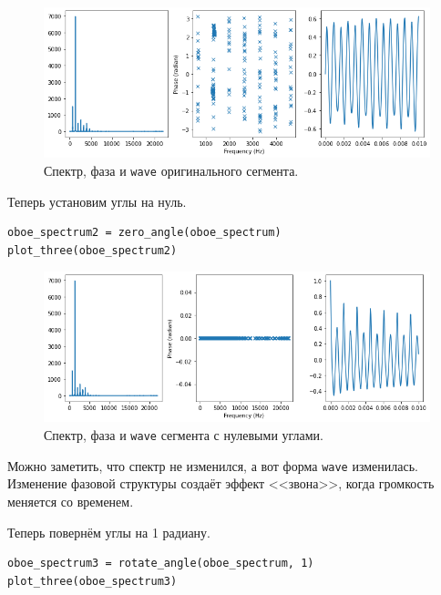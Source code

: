 \documentclass[a4paper, 14pt]{extarticle}
\begin{document}
    \begin{figure}[h]
        \centering
        \includegraphics[width=0.8\linewidth]{resources/Images/task3_three}
        \caption{Спектр, фаза и \texttt{wave} оригинального сегмента.}
        \label{fig:task3_three}
    \end{figure}

    Теперь установим углы на нуль.

    \begin{lstlisting}[caption= Применение \texttt{plot\_three} к сегменту с нулевыми углами., label={lst:task3_three_zero}]
oboe_spectrum2 = zero_angle(oboe_spectrum)
plot_three(oboe_spectrum2)  \end{lstlisting}

    \begin{figure}[h]
        \centering
        \includegraphics[width=0.8\linewidth]{resources/Images/task3_three_zero}
        \caption{Спектр, фаза и \texttt{wave} сегмента с нулевыми углами.}
        \label{fig:task3_three_zero}
    \end{figure}

    Можно заметить, что спектр не изменился, а вот форма \texttt{wave} изменилась.
    Изменение фазовой структуры создаёт эффект <<звона>>, когда громкость меняется со временем.

    Теперь повернём углы на 1 радиану.

    \begin{lstlisting}[caption= Применение \texttt{plot\_three} к сегменту с повёрнутыми углами., label={lst:task3_three_rotate}]
oboe_spectrum3 = rotate_angle(oboe_spectrum, 1)
plot_three(oboe_spectrum3)  \end{lstlisting}
\end{document}
